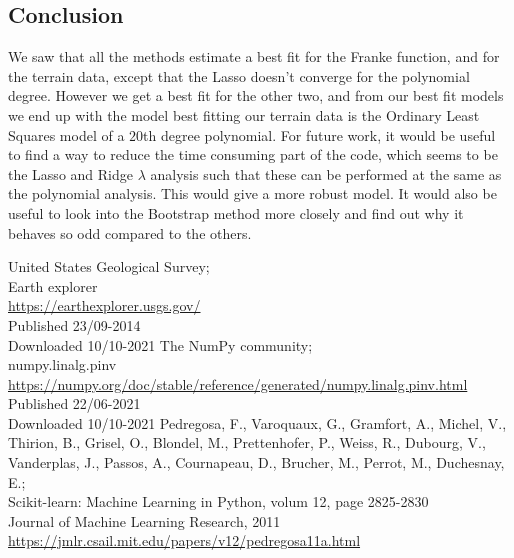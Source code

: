\documentclass[11pt, A4paper, english]{article}
\begin{document}
\begin{multicols}{2}
		\section{Conclusion}
We saw that all the methods estimate a best fit for the Franke function, and for the terrain data, except that the Lasso doesn't converge for the polynomial degree. However we get a best fit for the other two, and from our best fit models we end up with the model best fitting our terrain data is the Ordinary Least Squares model of a $20$th degree polynomial. For future work, it would be useful to find a way to reduce the time consuming part of the code, which seems to be the Lasso and Ridge $\lambda$ analysis such that these can be performed at the same as the polynomial analysis. This would give a more robust model. It would also be useful to look into the Bootstrap method more closely and find out why it behaves so odd compared to the others.
		
		\begin{thebibliography}{9}
United States Geological Survey; \\
Earth explorer \\
\url{https://earthexplorer.usgs.gov/} \\
Published 23/09-2014 \\
Downloaded 10/10-2021
The NumPy community; \\
numpy.linalg.pinv \\
\url{https://numpy.org/doc/stable/reference/generated/numpy.linalg.pinv.html} \\
Published 22/06-2021 \\
Downloaded 10/10-2021
Pedregosa, F., Varoquaux, G., Gramfort, A., Michel, V., Thirion, B., Grisel, O., Blondel, M., Prettenhofer, P., Weiss, R., Dubourg, V., Vanderplas, J., Passos, A., Cournapeau, D., Brucher, M., Perrot, M., Duchesnay, E.; \\
Scikit-learn: Machine Learning in Python, volum 12, page 2825-2830 \\
Journal of Machine Learning Research, 2011 \\
\url{https://jmlr.csail.mit.edu/papers/v12/pedregosa11a.html}
		\end{thebibliography}
	\end{multicols}
\end{document}
